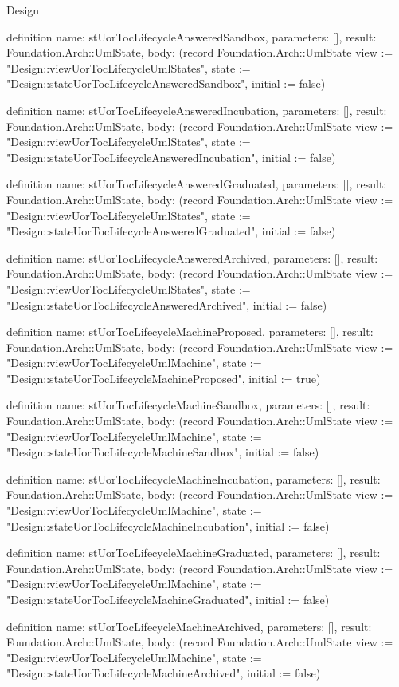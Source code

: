 \begin{lexlean}{Design}
\begin{semanticmodule}
definition{
  name: stUorTocLifecycleAnsweredSandbox,
  parameters: [],
  result: Foundation.Arch::UmlState,
  body: (record Foundation.Arch::UmlState {view := "Design::viewUorTocLifecycleUmlStates", state := "Design::stateUorTocLifecycleAnsweredSandbox", initial := false})
}

definition{
  name: stUorTocLifecycleAnsweredIncubation,
  parameters: [],
  result: Foundation.Arch::UmlState,
  body: (record Foundation.Arch::UmlState {view := "Design::viewUorTocLifecycleUmlStates", state := "Design::stateUorTocLifecycleAnsweredIncubation", initial := false})
}

definition{
  name: stUorTocLifecycleAnsweredGraduated,
  parameters: [],
  result: Foundation.Arch::UmlState,
  body: (record Foundation.Arch::UmlState {view := "Design::viewUorTocLifecycleUmlStates", state := "Design::stateUorTocLifecycleAnsweredGraduated", initial := false})
}

definition{
  name: stUorTocLifecycleAnsweredArchived,
  parameters: [],
  result: Foundation.Arch::UmlState,
  body: (record Foundation.Arch::UmlState {view := "Design::viewUorTocLifecycleUmlStates", state := "Design::stateUorTocLifecycleAnsweredArchived", initial := false})
}

definition{
  name: stUorTocLifecycleMachineProposed,
  parameters: [],
  result: Foundation.Arch::UmlState,
  body: (record Foundation.Arch::UmlState {view := "Design::viewUorTocLifecycleUmlMachine", state := "Design::stateUorTocLifecycleMachineProposed", initial := true})
}

definition{
  name: stUorTocLifecycleMachineSandbox,
  parameters: [],
  result: Foundation.Arch::UmlState,
  body: (record Foundation.Arch::UmlState {view := "Design::viewUorTocLifecycleUmlMachine", state := "Design::stateUorTocLifecycleMachineSandbox", initial := false})
}

definition{
  name: stUorTocLifecycleMachineIncubation,
  parameters: [],
  result: Foundation.Arch::UmlState,
  body: (record Foundation.Arch::UmlState {view := "Design::viewUorTocLifecycleUmlMachine", state := "Design::stateUorTocLifecycleMachineIncubation", initial := false})
}

definition{
  name: stUorTocLifecycleMachineGraduated,
  parameters: [],
  result: Foundation.Arch::UmlState,
  body: (record Foundation.Arch::UmlState {view := "Design::viewUorTocLifecycleUmlMachine", state := "Design::stateUorTocLifecycleMachineGraduated", initial := false})
}

definition{
  name: stUorTocLifecycleMachineArchived,
  parameters: [],
  result: Foundation.Arch::UmlState,
  body: (record Foundation.Arch::UmlState {view := "Design::viewUorTocLifecycleUmlMachine", state := "Design::stateUorTocLifecycleMachineArchived", initial := false})
}


\end{semanticmodule}
\end{lexlean}
